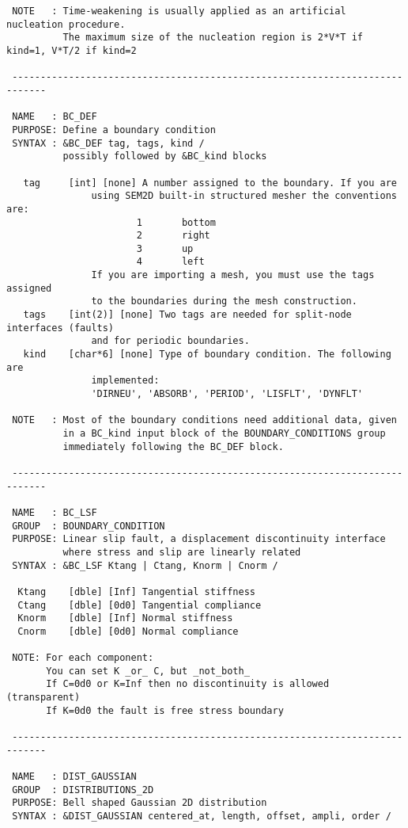 \begin{verbatim}
 NOTE   : Time-weakening is usually applied as an artificial nucleation procedure.
          The maximum size of the nucleation region is 2*V*T if kind=1, V*T/2 if kind=2

 ----------------------------------------------------------------------------

 NAME   : BC_DEF
 PURPOSE: Define a boundary condition
 SYNTAX : &BC_DEF tag, tags, kind /
          possibly followed by &BC_kind blocks 

   tag     [int] [none] A number assigned to the boundary. If you are
               using SEM2D built-in structured mesher the conventions are:
                       1       bottom
                       2       right
                       3       up
                       4       left
               If you are importing a mesh, you must use the tags assigned
               to the boundaries during the mesh construction.
   tags    [int(2)] [none] Two tags are needed for split-node interfaces (faults)
               and for periodic boundaries.
   kind    [char*6] [none] Type of boundary condition. The following are
               implemented:
               'DIRNEU', 'ABSORB', 'PERIOD', 'LISFLT', 'DYNFLT'

 NOTE   : Most of the boundary conditions need additional data, given
          in a BC_kind input block of the BOUNDARY_CONDITIONS group
          immediately following the BC_DEF block.

 ----------------------------------------------------------------------------

 NAME   : BC_LSF 
 GROUP  : BOUNDARY_CONDITION
 PURPOSE: Linear slip fault, a displacement discontinuity interface
          where stress and slip are linearly related
 SYNTAX : &BC_LSF Ktang | Ctang, Knorm | Cnorm /

  Ktang    [dble] [Inf] Tangential stiffness
  Ctang    [dble] [0d0] Tangential compliance
  Knorm    [dble] [Inf] Normal stiffness
  Cnorm    [dble] [0d0] Normal compliance

 NOTE: For each component:
       You can set K _or_ C, but _not_both_
       If C=0d0 or K=Inf then no discontinuity is allowed (transparent)
       If K=0d0 the fault is free stress boundary

 ----------------------------------------------------------------------------

 NAME   : DIST_GAUSSIAN
 GROUP  : DISTRIBUTIONS_2D
 PURPOSE: Bell shaped Gaussian 2D distribution 
 SYNTAX : &DIST_GAUSSIAN centered_at, length, offset, ampli, order /


\end{verbatim}

